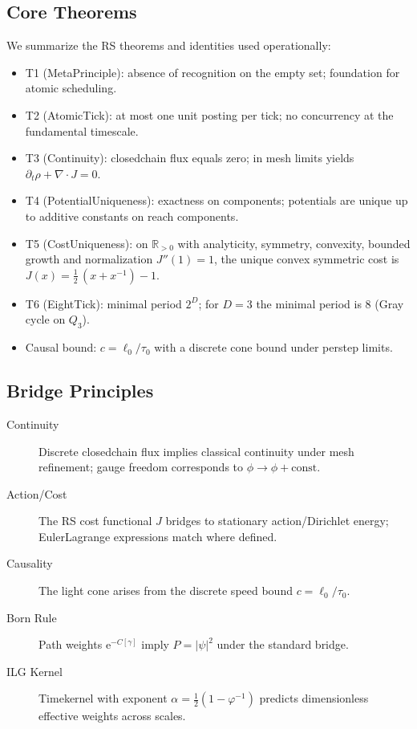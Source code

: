 \documentclass[11pt,a4paper]{article}
\newcommand{\RR}{\mathbb{R}}
\newcommand{\e}{\mathrm{e}}
\begin{document}
\subsection{Core Theorems}
We summarize the RS theorems and identities used operationally:
\begin{itemize}
  \item T1 (MetaPrinciple): absence of recognition on the empty set; foundation for atomic scheduling.
  \item T2 (AtomicTick): at most one unit posting per tick; no concurrency at the fundamental timescale.
  \item T3 (Continuity): closed\textendash chain flux equals zero; in mesh limits yields \(\partial_t \rho + \nabla\cdot J = 0\).
  \item T4 (PotentialUniqueness): exactness on components; potentials are unique up to additive constants on reach components.
  \item T5 (CostUniqueness): on \(\RR_{>0}\) with analyticity, symmetry, convexity, bounded growth and normalization \(J''(1)=1\), the unique convex symmetric cost is \(J(x)=\tfrac{1}{2}\,(x+x^{-1})-1\).
  \item T6 (EightTick): minimal period \(2^D\); for \(D=3\) the minimal period is 8 (Gray cycle on \(Q_3\)).
  \item Causal bound: \(c=\ell_0/\tau_0\) with a discrete cone bound under per\textendash step limits.
\end{itemize}

\subsection{Bridge Principles}
\begin{description}
  \item[Continuity] Discrete closed\textendash chain flux implies classical continuity under mesh refinement; gauge freedom corresponds to \(\phi\to \phi + \mathrm{const}\).
  \item[Action/Cost] The RS cost functional \(J\) bridges to stationary action/Dirichlet energy; Euler\textendash Lagrange expressions match where defined.
  \item[Causality] The light cone arises from the discrete speed bound \(c=\ell_0/\tau_0\).
  \item[Born Rule] Path weights \(\e^{-C[\gamma]}\) imply \(P=\lvert\psi\rvert^2\) under the standard bridge.
  \item[ILG Kernel] Time\textendash kernel with exponent \(\alpha=\tfrac{1}{2}(1-\varphi^{-1})\) predicts dimensionless effective weights across scales.
\end{description}
\end{document}
